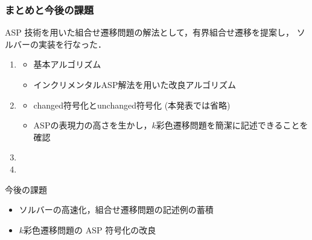\documentclass[dvipdfmx,11pt]{beamer}
\begin{document}
\begin{frame}\frametitle{まとめと今後の課題}

  \begin{alertblock}{}\centering
    ASP 技術を用いた組合せ遷移問題の解法として，有界組合せ遷移を提案し，
    ソルバーの実装を行なった．
  \end{alertblock}

  \begin{enumerate}
  \item {}
    \begin{itemize}
    \item 基本アルゴリズム
    \item インクリメンタルASP解法を用いた改良アルゴリズム
    \end{itemize}
  \item {}
    \begin{itemize}
    \item \textsf{changed}符号化と\textsf{unchanged}符号化 (本発表では省略)
    \item ASPの表現力の高さを生かし，$k$彩色遷移問題を簡潔に記述できることを確認
    \end{itemize}
  \item {}
  \item {}
  \end{enumerate}

  
  \begin{alertblock}{今後の課題}
    \begin{itemize}
      \item ソルバーの高速化，組合せ遷移問題の記述例の蓄積
      \item $k$彩色遷移問題の ASP 符号化の改良
    \end{itemize}
  \end{alertblock}
\end{frame}


\end{document}
